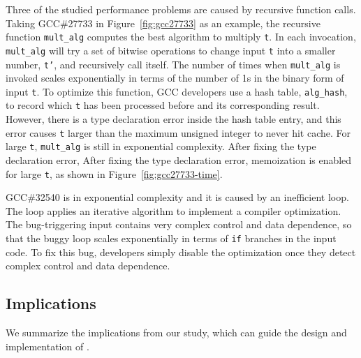 Three of the studied performance problems are caused by recursive function calls. 
Taking GCC\#27733 in Figure~\ref{fig:gcc27733} as an example, 
the recursive function \texttt{mult\_alg} computes the best algorithm to multiply \texttt{t}.
In each invocation, \texttt{mult\_alg} will try a set of bitwise 
operations to change input 
\texttt{t} into a smaller number, \texttt{t'}, 
and recursively call itself.
The number of times when \texttt{mult\_alg} is invoked scales exponentially 
in terms of the number of 1s in the binary form of input \texttt{t}.
To optimize this function, 
GCC developers use a hash table, \texttt{alg\_hash}, to record
which \texttt{t} has been processed before and its corresponding result.
However, there is a type declaration error inside the hash table entry,
and this error causes \texttt{t} larger than the maximum unsigned integer to never hit cache.
For large \texttt{t}, \texttt{mult\_alg} is still in exponential complexity. 
After fixing the type declaration error, 
After fixing the type declaration error, 
memoization is enabled for large \texttt{t}, 
as shown in Figure~\ref{fig:gcc27733-time}.

GCC\#32540 is in exponential complexity and it is caused by an inefficient loop. 
The loop applies an iterative algorithm to implement a compiler optimization. 
The bug-triggering input contains very complex control and data dependence,  
so that the buggy loop scales exponentially in terms of 
\texttt{if} branches in the input code. 
To fix this bug, developers simply disable the optimization 
once they detect complex control and data dependence.  
 
\subsection{Implications}
\label{sec:study_impli}

We summarize the implications from our study, which can guide
the design and implementation of \Tool.

